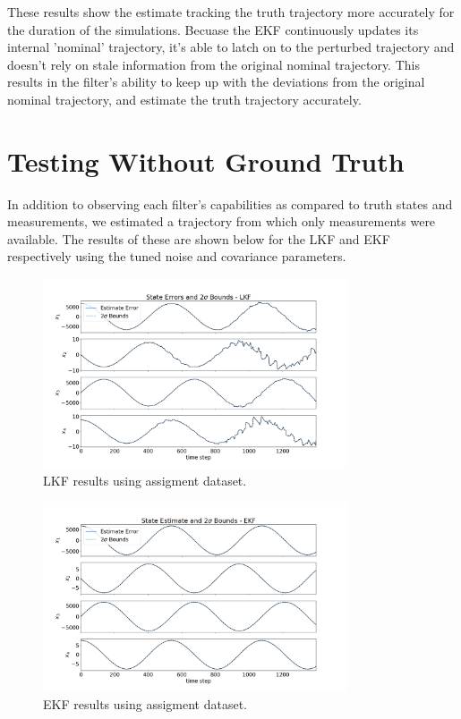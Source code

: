 \documentclass[11pt, a4paper]{article}
\begin{document}
These results show the estimate tracking the truth trajectory more accurately for the duration of the simulations. 
Becuase the EKF continuously updates its internal 'nominal' trajectory, it's able to latch on to the perturbed trajectory and doesn't rely on stale information from the original nominal trajectory. 
This results in the filter's ability to keep up with the deviations from the original nominal trajectory, and estimate the truth trajectory accurately.


\section{Testing Without Ground Truth}
In addition to observing each filter's capabilities as compared to truth states and measurements, we estimated a trajectory from which only measurements were available. 
The results of these  are shown below for the LKF and EKF respectively using the tuned noise and covariance parameters. 


\begin{figure}[H]
	\centering
	\includegraphics[width=0.8\textwidth]{Figures/lkf_dataste_est.png}
	\caption{LKF results using assigment dataset.}
	\label{fig:lkf_dataset}
\end{figure}

\begin{figure}[H]
	\centering
	\includegraphics[width=0.8\textwidth]{Figures/ekf_dataset_est.png}
	\caption{EKF results using assigment dataset.}
	\label{fig:ekf_dataset}
\end{figure}
\end{document}
